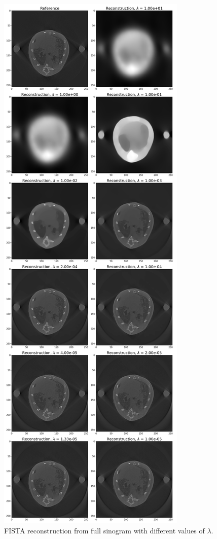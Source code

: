 \documentclass[12pt]{article}
\begin{document}
\newpage
\setcounter{figure}{0}
\renewcommand{\thefigure}{S\arabic{figure}}
\begin{figure}[h]
	\centering
	\includegraphics[height=0.8\paperheight]{../results/fistaFullImages.png}
	\caption{FISTA reconstruction from full sinogram with different values of $\lambda$.}
	\label{fig:fullReconstructions}
\end{figure}
\end{document}
